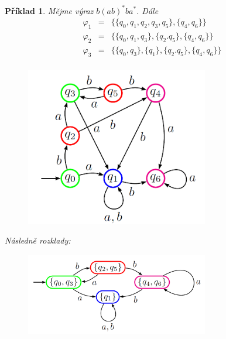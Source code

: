 \documentclass[10pt,a4paper]{article}
\theoremstyle{note}
\newtheorem{priklad}{Příklad}
\begin{document}
\begin{priklad}
Mějme v\'yraz $b(ab)^{*}ba^{*}$. D\'ale
\begin{eqnarray*}
\varphi_{1} &=& \lbrace \lbrace q_{0},q_{1},q_{2},q_{3},q_{5} \rbrace, \lbrace q_{4}, q_{6} \rbrace \rbrace \\
\varphi_{2} &=& \lbrace \lbrace q_{0},q_{1},q_{3} \rbrace, \lbrace q_{2}.q_{5} \rbrace, \lbrace q_{4}, q_{6} \rbrace \rbrace \\
\varphi_{3} &=& \lbrace \lbrace q_{0},q_{3} \rbrace, \lbrace q_{1} \rbrace, \lbrace q_{2}.q_{5} \rbrace, \lbrace q_{4}, q_{6} \rbrace \rbrace \\
\end{eqnarray*}
\begin{figure}[H]
			\centering
			\includegraphics[width=8cm]{img/min2.png}
			\end{figure}

N\'asledně rozklady:
\begin{figure}[H]
			\centering
			\includegraphics[width=8cm]{img/min3.png}
			\end{figure}


\end{priklad}
\end{document}
